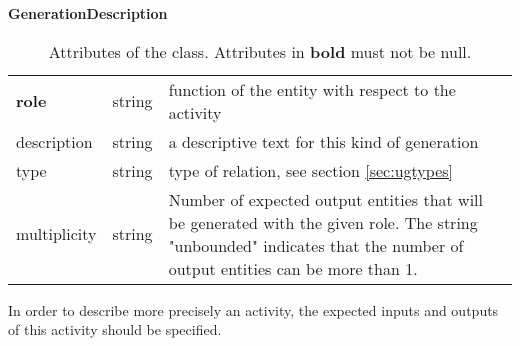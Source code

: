 \begin{table}[ht]
\small
{}\textwidth
\textbf{\normalsize GenerationDescription}\vspace{0.25em}\\
\begin{tabulary}{1.0\textwidth}{llL}
\toprule
{} &  & \\
\midrule
\textbf{role} & string & function of the entity with respect to the activity \\
description  & string & a descriptive text for this kind of generation \\
type & string   & type of relation, see section \ref{sec:ugtypes} \\
multiplicity & string & Number of expected output entities that will be generated with the given role. The string "unbounded" indicates that the number of output entities can be more than 1. \\
\bottomrule
\end{tabulary}
\caption[Attributes of the  class]{Attributes of the  class. Attributes in \textbf{bold} must not be null.}
\label{tab:wasgeneratedbydescription}
\end{table}


In order to describe more precisely an activity, the expected inputs and outputs of this activity should be specified.


